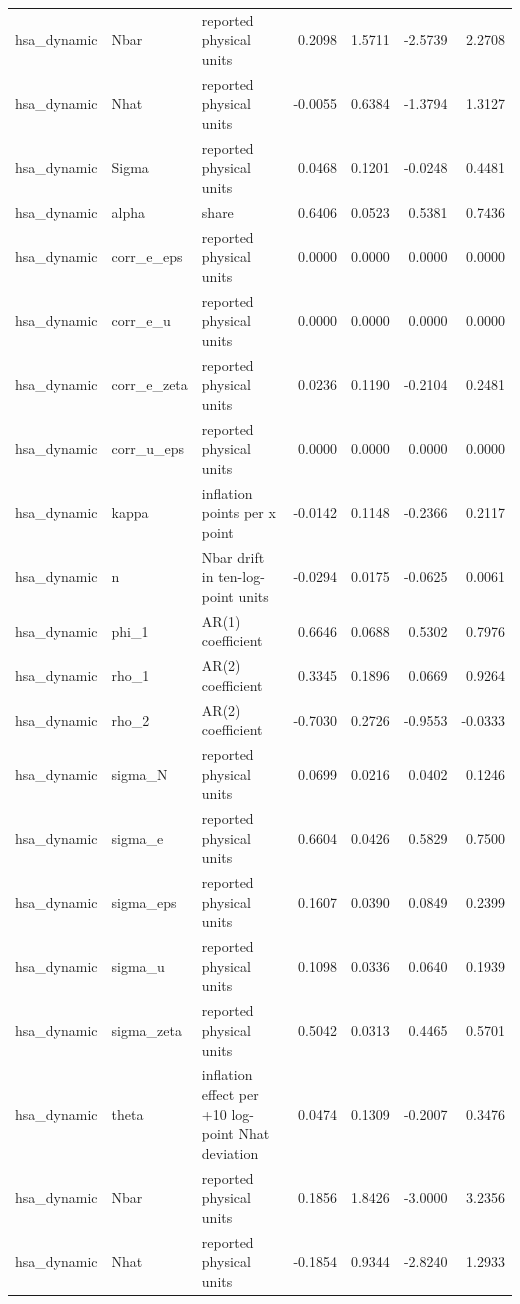\begin{tabular}{lllrrrr}
hsa\_dynamic & Nbar & reported physical units & 0.2098 & 1.5711 & -2.5739 & 2.2708 \\
hsa\_dynamic & Nhat & reported physical units & -0.0055 & 0.6384 & -1.3794 & 1.3127 \\
hsa\_dynamic & Sigma & reported physical units & 0.0468 & 0.1201 & -0.0248 & 0.4481 \\
hsa\_dynamic & alpha & share & 0.6406 & 0.0523 & 0.5381 & 0.7436 \\
hsa\_dynamic & corr\_e\_eps & reported physical units & 0.0000 & 0.0000 & 0.0000 & 0.0000 \\
hsa\_dynamic & corr\_e\_u & reported physical units & 0.0000 & 0.0000 & 0.0000 & 0.0000 \\
hsa\_dynamic & corr\_e\_zeta & reported physical units & 0.0236 & 0.1190 & -0.2104 & 0.2481 \\
hsa\_dynamic & corr\_u\_eps & reported physical units & 0.0000 & 0.0000 & 0.0000 & 0.0000 \\
hsa\_dynamic & kappa & inflation points per x point & -0.0142 & 0.1148 & -0.2366 & 0.2117 \\
hsa\_dynamic & n & Nbar drift in ten-log-point units & -0.0294 & 0.0175 & -0.0625 & 0.0061 \\
hsa\_dynamic & phi\_1 & AR(1) coefficient & 0.6646 & 0.0688 & 0.5302 & 0.7976 \\
hsa\_dynamic & rho\_1 & AR(2) coefficient & 0.3345 & 0.1896 & 0.0669 & 0.9264 \\
hsa\_dynamic & rho\_2 & AR(2) coefficient & -0.7030 & 0.2726 & -0.9553 & -0.0333 \\
hsa\_dynamic & sigma\_N & reported physical units & 0.0699 & 0.0216 & 0.0402 & 0.1246 \\
hsa\_dynamic & sigma\_e & reported physical units & 0.6604 & 0.0426 & 0.5829 & 0.7500 \\
hsa\_dynamic & sigma\_eps & reported physical units & 0.1607 & 0.0390 & 0.0849 & 0.2399 \\
hsa\_dynamic & sigma\_u & reported physical units & 0.1098 & 0.0336 & 0.0640 & 0.1939 \\
hsa\_dynamic & sigma\_zeta & reported physical units & 0.5042 & 0.0313 & 0.4465 & 0.5701 \\
hsa\_dynamic & theta & inflation effect per +10 log-point Nhat deviation & 0.0474 & 0.1309 & -0.2007 & 0.3476 \\
hsa\_dynamic & Nbar & reported physical units & 0.1856 & 1.8426 & -3.0000 & 3.2356 \\
hsa\_dynamic & Nhat & reported physical units & -0.1854 & 0.9344 & -2.8240 & 1.2933 \\

\end{tabular}
